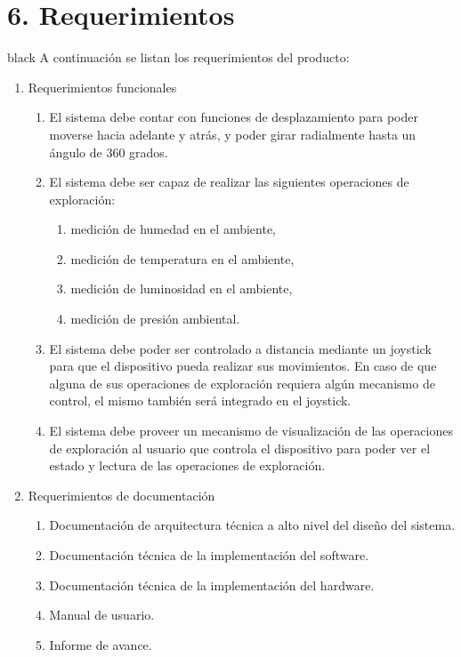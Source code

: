 \documentclass[
11pt, %
]{charter}
\begin{document}
\section{6. Requerimientos}
\label{sec:requerimientos}
\begin{consigna}{black}
A continuación se listan los requerimientos del producto:
\begin{enumerate}	
	\item Requerimientos funcionales		
	\begin{enumerate}			
		\item El sistema debe contar con funciones de desplazamiento para poder moverse hacia adelante y atrás, y poder girar radialmente hasta un ángulo de 360 grados.			
		\item El sistema debe ser capaz de realizar las siguientes operaciones de exploración:			
			\begin{enumerate}				
				\item medición de humedad en el ambiente,				
				\item medición de temperatura en el ambiente,				
				\item medición de luminosidad en el ambiente,				
				\item medición de presión ambiental.			
			\end{enumerate}			
		\item El sistema debe poder ser controlado a distancia mediante un joystick para que el dispositivo pueda realizar sus movimientos. En caso de que alguna de sus operaciones de exploración requiera algún mecanismo de control, el mismo también será integrado en el joystick.		
		\item El sistema debe proveer un mecanismo de visualización de las operaciones de exploración al usuario que controla el dispositivo para poder ver el estado y lectura de las operaciones de exploración.		
		\end{enumerate}	
	\item Requerimientos de documentación		
		\begin{enumerate}			
			\item Documentación de arquitectura técnica a alto nivel del diseño del sistema.			
			\item Documentación técnica de la implementación del software.			
			\item Documentación técnica de la implementación del hardware.			
			\item Manual de usuario.	
			\item Informe de avance.

\end{enumerate}
\end{enumerate}
\end{consigna}
\end{document}
